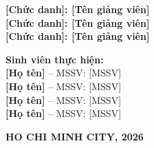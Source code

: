 \begin{titlepage}
\begin{center}
    \makebox[\textwidth][c]{\large\bfseries \color{black!70!black}[TIÊU ĐỀ ĐỒ ÁN - PA2]}
    
    \vspace{1.5cm}

    \begin{tcolorbox}[colback=blue!5!white, colframe=blue!50!black, width=0.9\textwidth, boxrule=0.8pt, arc=3pt, left=8pt, right=8pt]
        \textbf{[Chức danh]: [Tên giảng viên]}\\
        \textbf{[Chức danh]: [Tên giảng viên]}\\
        \textbf{[Chức danh]: [Tên giảng viên]}
    \end{tcolorbox}
    \vspace{1cm}

    \begin{tcolorbox}[colback=gray!10!white, colframe=gray!60!black, width=0.9\textwidth, boxrule=0.8pt, arc=3pt, left=8pt, right=8pt]
        \textbf{Sinh viên thực hiện:} \\
        {\textbf{[Họ tên]}} -- MSSV: {[MSSV]} \\ 
        {\textbf{[Họ tên]}} -- MSSV: {[MSSV]} \\
        {\textbf{[Họ tên]}} -- MSSV: {[MSSV]} \\
        {\textbf{[Họ tên]}} -- MSSV: {[MSSV]}
        
    \end{tcolorbox}

    \vfill
    {\large\textbf{HO CHI MINH CITY, 2026}}
\end{center}
\end{titlepage}
